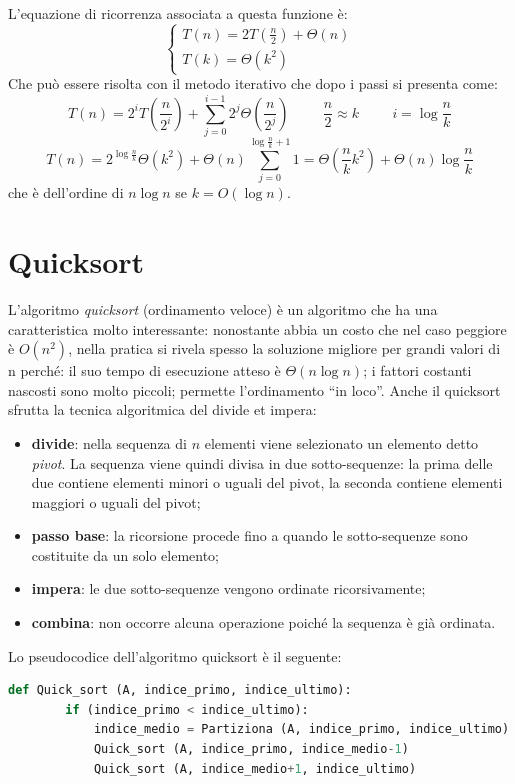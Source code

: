 L’equazione di ricorrenza associata a questa funzione è:
$$\begin{cases}
    T(n)=2T(\frac{n}{2})+ \Theta(n)\\
    T(k)= \Theta(k^2)
\end{cases}$$
Che può essere risolta con il metodo iterativo che dopo i passi si presenta come:
\begin{equation*}
    T(n)=2^iT(\frac{n}{2^i})+\sum^{i-1}_{j=0}2^j\Theta(\frac{n}{2^j})\hspace{1cm}\frac{n}{2}\approx k\hspace{1cm}i=\log\frac{n}{k}
\end{equation*}
\begin{equation*}
    T(n)=2^{\log\frac{n}{k}} \Theta(k^2) + \Theta(n) \sum_{j=0}^{\log\frac{n}{k}+1}1 = \Theta(\frac{n}{k}k^2) + \Theta(n)\log\frac{n}{k}
\end{equation*}
che è dell’ordine di $n\log n$ se $k=O(\log n)$.


\section{Quicksort}
L’algoritmo \textit{quicksort} (ordinamento veloce) è un algoritmo che ha una caratteristica molto interessante: nonostante abbia un costo che nel caso peggiore è $O(n^2)$, nella pratica si rivela spesso la soluzione migliore per grandi valori di n perché: il suo tempo di esecuzione atteso è $\Theta(n \log n)$; i fattori costanti nascosti sono molto piccoli; permette l’ordinamento “in loco”.
Anche il quicksort sfrutta la tecnica algoritmica del divide et impera:
\begin{itemize}
    \item \textbf{divide}: nella sequenza di $n$ elementi viene selezionato un elemento detto \textit{pivot}. La sequenza viene quindi divisa in due sotto-sequenze: la prima delle due contiene elementi minori o uguali del pivot, la seconda contiene elementi maggiori o uguali del pivot;
    \item \textbf{passo base}: la ricorsione procede fino a quando le sotto-sequenze sono costituite da un solo elemento;
    \item \textbf{impera}: le due sotto-sequenze vengono ordinate ricorsivamente;
    \item \textbf{combina}: non occorre alcuna operazione poiché la sequenza è già ordinata.
\end{itemize}

Lo pseudocodice dell’algoritmo quicksort è il seguente:
\begin{lstlisting}[language=Python]
    def Quick_sort (A, indice_primo, indice_ultimo):
        if (indice_primo < indice_ultimo):
            indice_medio = Partiziona (A, indice_primo, indice_ultimo)
            Quick_sort (A, indice_primo, indice_medio-1)
            Quick_sort (A, indice_medio+1, indice_ultimo)
\end{lstlisting}

